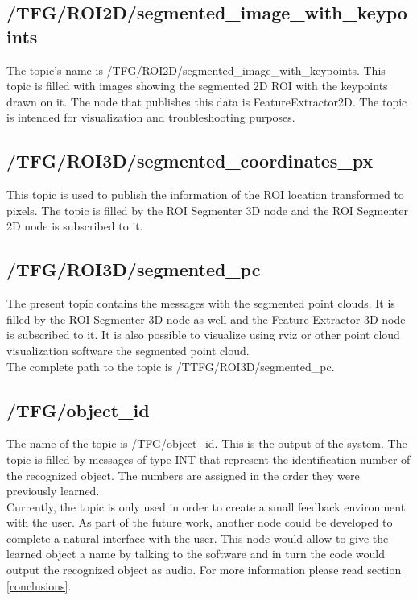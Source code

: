 \subsection{/TFG/ROI2D/segmented\_image\_with\_keypoints}
The topic's name is /TFG/ROI2D/segmented\_image\_with\_keypoints. This topic is filled with images showing the segmented 2D ROI with the keypoints drawn on it. The node that publishes this data is FeatureExtractor2D. The topic is intended for visualization and troubleshooting purposes. 

\subsection{/TFG/ROI3D/segmented\_coordinates\_px}
This topic is used to publish the information of the ROI location transformed to pixels. The topic is filled by the ROI Segmenter 3D node and the ROI Segmenter 2D node is subscribed to it. 

\subsection{/TFG/ROI3D/segmented\_pc}
The present topic contains the messages with the segmented point clouds. It is filled by the ROI Segmenter 3D node as well and the Feature Extractor 3D node is subscribed to it. It is also possible to visualize using rviz or other point cloud visualization software the segmented point cloud. 
\\

The complete path to the topic is /TTFG/ROI3D/segmented\_pc.


\subsection{/TFG/object\_id}
The name of the topic is /TFG/object\_id. This is the output of the system. The topic is filled by messages of type INT that represent the identification number of the recognized object. The numbers are assigned in the order they were previously learned. 
\\

Currently, the topic is only used in order to create a small feedback environment with the user. As part of the future work, another node could be developed to complete a natural interface with the user. This node would allow to give the learned object a name by talking to the software and in turn the code would output the recognized object as audio. For more information please read section \ref{conclusions}.